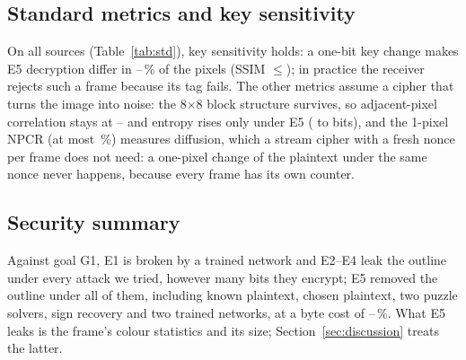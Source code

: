 \subsection{Standard metrics and key sensitivity}

On all \StdSources{} sources (Table~\ref{tab:std}), key sensitivity holds: a one-bit key change makes E5 decryption differ in \StdNpcrEfiveMin--\StdNpcrEfiveMax\,\% of the pixels (SSIM $\le$\StdWrongSsimEfiveMax); in practice the receiver rejects such a frame because its tag fails. The other metrics assume a cipher that turns the image into noise: the 8$\times$8 block structure survives, so adjacent-pixel correlation stays at \StdCorrMin--\StdCorrMax{} and entropy rises only under E5 (\StdEntropyPlain{} to \StdEntropyEfive{} bits), and the 1-pixel NPCR (at most \StdPixelNpcrMax\,\%) measures diffusion, which a stream cipher with a fresh nonce per frame does not need: a one-pixel change of the plaintext under the same nonce never happens, because every frame has its own counter.

\subsection{Security summary}
Against goal G1, E1 is broken by a trained network and E2--E4 leak the outline under every attack we tried, however many bits they encrypt; E5 removed the outline under all of them, including known plaintext, chosen plaintext, two puzzle solvers, sign recovery and two trained networks, at a byte cost of \RiOverheadOneMin--\RiOverheadOneMax\,\%. What E5 leaks is the frame's colour statistics and its size; Section~\ref{sec:discussion} treats the latter.
